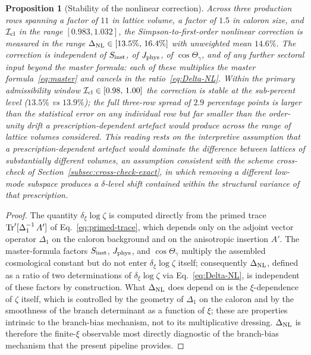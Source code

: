 \documentclass[a4paper,11pt]{article}
\newtheorem{proposition}[theorem]{Proposition}
\theoremstyle{definition}
\newcommand{\Tr}{\mathop{\rm Tr}}
\newcommand{\Icl}{\mathcal{I}_{\rm cl}}
\newcommand{\Jphys}{J_{\rm phys}}
\begin{document}
\begin{proposition}[Stability of the nonlinear correction]
\label{prop:universality}
Across three production rows spanning a factor of $11$ in lattice
volume, a factor of $1.5$ in caloron size, and $\Icl$ in the range
$[0.983, 1.032]$, the Simpson-to-first-order nonlinear correction
is measured in the range $\Delta_{\rm NL} \in [13.5\%,\,16.4\%]$
with unweighted mean $14.6\%$. The correction is independent of
$S_{\rm inst}$, of $\Jphys$, of $\cos\Theta_\gamma$, and of any
further sectoral input beyond the master formula: each of these
multiplies the master formula~\eqref{eq:master} and cancels in the
ratio~\eqref{eq:Delta-NL}. Within the primary admissibility window
$\Icl \in [0.98,\,1.00]$ the correction is stable at the
sub-percent level ($13.5\%$ vs $13.9\%$); the full three-row
spread of $2.9$ percentage points is larger than the statistical
error on any individual row but far smaller than the order-unity
drift a prescription-dependent artefact would produce across the
range of lattice volumes considered. This reading rests on the
interpretive assumption that a prescription-dependent artefact
would dominate the difference between lattices of substantially
different volumes, an assumption consistent with the scheme
cross-check of Section~\ref{subsec:cross-check-exact}, in which removing
a different low-mode subspace produces a $\delta$-level shift
contained within the structural variance of that prescription.
\end{proposition}

\begin{proof}
The quantity $\delta_\xi \log\zeta$ is computed directly from the
primed trace $\Tr'[\Delta_1^{-1}\,A']$ of
Eq.~\eqref{eq:primed-trace}, which depends only on the adjoint
vector operator $\Delta_1$ on the caloron background and on the
anisotropic insertion $A'$. The master-formula factors $S_{\rm
inst}$, $\Jphys$, and $\cos\Theta_\gamma$ multiply the assembled
cosmological constant but do not enter $\delta_\xi \log\zeta$ itself;
consequently $\Delta_{\rm NL}$, defined as a ratio of two
determinations of $\delta_\xi \log\zeta$ via
Eq.~\eqref{eq:Delta-NL}, is independent of these factors by
construction. What $\Delta_{\rm NL}$ does depend on is the
$\xi$-dependence of $\zeta$ itself, which is controlled by the
geometry of $\Delta_1$ on the caloron and by the smoothness of the
branch determinant as a function of $\xi$; these are properties
intrinsic to the branch-bias mechanism, not to its multiplicative
dressing. $\Delta_{\rm NL}$ is therefore the finite-$\xi$ observable
most directly diagnostic of the branch-bias mechanism that the
present pipeline provides.
\end{proof}
\end{document}
